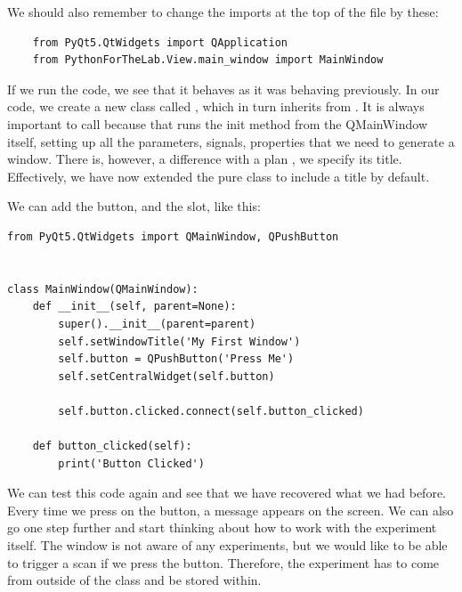 We should also remember to change the imports at the top of the file by these:

\begin{verbatim}
    from PyQt5.QtWidgets import QApplication
    from PythonForTheLab.View.main_window import MainWindow
\end{verbatim}

If we run the code, we see that it behaves as it was behaving previously. In our code, we create a new class called , which in turn inherits from . It is always important to call  because that runs the init method from the QMainWindow itself, setting up all the parameters, signals, properties that we need to generate a window. There is, however, a difference with a plan , we specify its title. Effectively, we have now extended the pure  class to include a title by default.


We can add the button, and the slot, like this:

\begin{verbatim}
from PyQt5.QtWidgets import QMainWindow, QPushButton


class MainWindow(QMainWindow):
    def __init__(self, parent=None):
        super().__init__(parent=parent)
        self.setWindowTitle('My First Window')
        self.button = QPushButton('Press Me')
        self.setCentralWidget(self.button)

        self.button.clicked.connect(self.button_clicked)

    def button_clicked(self):
        print('Button Clicked')
\end{verbatim}

We can test this code again and see that we have recovered what we had before. Every time we press on the button, a message appears on the screen. We can also go one step further and start thinking about how to work with the experiment itself. The window is not aware of any experiments, but we would like to be able to trigger a scan if we press the button. Therefore, the experiment has to come from outside of the class and be stored within.

